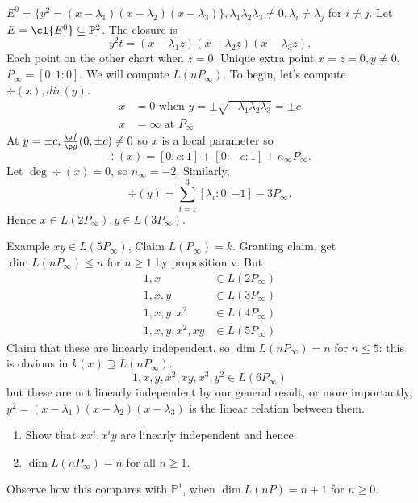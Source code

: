 \documentclass[a4paper]{article}
\renewcommand*{\P}{\mathbb{P}}
\begin{document}
\begin{eg}
  \(E^0 = \{y^2 = (x - \lambda_1)(x - \lambda_2)(x - \lambda_3)\}, \lambda_1\lambda_2\lambda_3 \neq 0, \lambda_i \neq \lambda_j\) for \(i \neq j\). Let \(E = \cl{E^0} \subseteq \P^2\). The closure is
  \[
    y^2t = (x - \lambda_1z)(x - \lambda_2z)(x - \lambda_3z).
  \]
  Each point on the other chart when \(z = 0\). Unique extra point \(x = z = 0, y \neq 0\), \(P_\infty = [0:1:0]\). We will compute \(L(nP_\infty)\). To begin, let's compute \(\div(x), div(y)\).
  \begin{align*}
    x &= 0 \text{ when } y = \pm \sqrt{-\lambda_1\lambda_2\lambda_3} = \pm c \\
    x &= \infty \text{ at } P_\infty
  \end{align*}
  At \(y = \pm c, \frac{\p f}{\p y} (0, \pm c) \neq 0\) so \(x\) is a local parameter so
  \[
    \div(x) = [0: c: 1] + [0: -c: 1] + n_\infty P_\infty.
  \]
  Let \(\deg \div(x) = 0\), so \(n_\infty = -2\). Similarly,
  \[
    \div(y) = \sum_{i = 1}^3 [\lambda_i: 0: -1] - 3 P_\infty.
  \]
  Hence \(x \in L(2 P_\infty), y \in L(3 P_\infty)\).

  Example \(xy \in L(5P_\infty)\), Claim \(L(P_\infty) = k\). Granting claim, get \(\dim L(nP_\infty) \leq n\) for \(n \geq 1\) by proposition v. But
  \begin{align*}
    1, x &\in L(2P_\infty) \\
    1, x, y &\in L(3P_\infty) \\
    1, x, y, x^2 &\in L(4P_\infty) \\
    1, x, y, x^2, xy &\in L(5P_\infty)
  \end{align*}
  Claim that these are linearly independent, so \(\dim L(nP_\infty) = n\) for \(n \leq 5\): this is obvious in \(k(x) \supseteq L(nP_\infty)\).
  \[
    1, x, y, x^2, xy, x^3, y^2 \in L(6P_\infty)
  \]
  but these are not linearly independent by our general result, or more importantly, \(y^2 = (x - \lambda_1)(x - \lambda_2)(x - \lambda_3)\) is the linear relation between them.
  \begin{ex}\leavevmode
    \begin{enumerate}
    \item Show that \(xx^i, x^iy\) are linearly independent and hence
    \item \(\dim L(nP_\infty) = n\) for all \(n \geq 1\).
    \end{enumerate}
  \end{ex}

  Observe how this compares with \(\P^1\), when \(\dim L(nP) = n + 1\) for \(n \geq 0\).


\end{eg}
\end{document}
